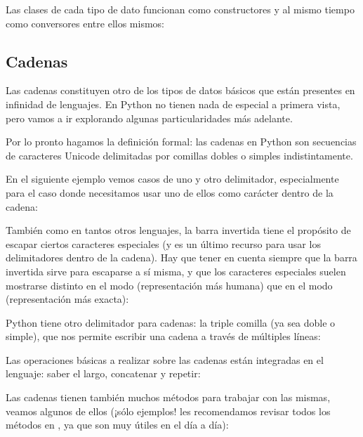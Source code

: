 Las clases de cada tipo de dato funcionan como constructores y al mismo tiempo como conversores entre ellos mismos:



\subsection{Cadenas}\label{sub:cadenas}

Las cadenas constituyen otro de los tipos de datos básicos que están presentes en infinidad de lenguajes. En Python no tienen nada de especial a primera vista, pero vamos a ir explorando algunas particularidades más adelante.

Por lo pronto hagamos la definición formal: las cadenas en Python son secuencias de caracteres Unicode delimitadas por comillas dobles o simples indistintamente.

En el siguiente ejemplo vemos casos de uno y otro delimitador, especialmente para el caso donde necesitamos usar uno de ellos como carácter dentro de la cadena:


También como en tantos otros lenguajes, la barra invertida tiene el propósito de escapar ciertos caracteres especiales (y es un último recurso para usar los delimitadores dentro de la cadena). Hay que tener en cuenta siempre que la barra invertida sirve para escaparse a sí misma, y que los caracteres especiales suelen mostrarse distinto en el modo  (representación más humana) que en el modo  (representación más exacta):


Python tiene otro delimitador para cadenas: la triple comilla (ya sea doble o simple), que nos permite escribir una cadena a través de múltiples líneas:


Las operaciones básicas a realizar sobre las cadenas están integradas en el lenguaje: saber el largo, concatenar y repetir:


Las cadenas tienen también muchos métodos para trabajar con las mismas, veamos algunos de ellos (¡sólo ejemplos! les recomendamos revisar todos los métodos en \cite{stdlib_str}, ya que son muy útiles en el día a día):

